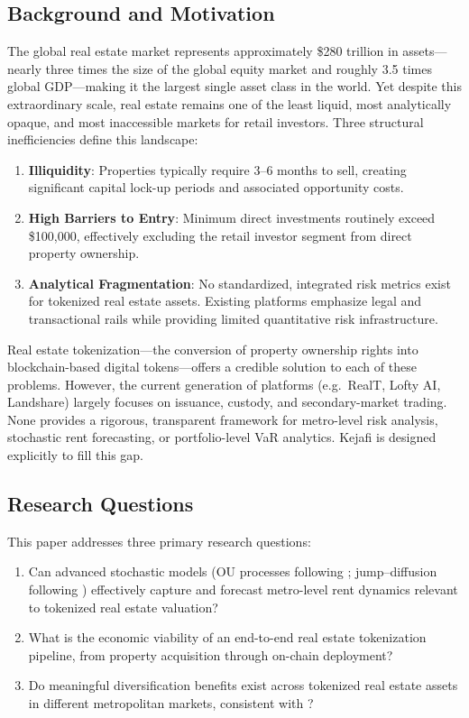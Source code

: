 \documentclass[11pt,letterpaper]{article}
\begin{document}
\subsection{Background and Motivation}

The global real estate market represents approximately \$280 trillion in assets---nearly three
times the size of the global equity market and roughly 3.5 times global GDP---making it the
largest single asset class in the world. Yet despite this extraordinary scale, real estate
remains one of the least liquid, most analytically opaque, and most inaccessible markets for
retail investors. Three structural inefficiencies define this landscape:

\begin{enumerate}[leftmargin=2em]
  \item \textbf{Illiquidity}: Properties typically require 3--6 months to sell, creating
  significant capital lock-up periods and associated opportunity costs.
  \item \textbf{High Barriers to Entry}: Minimum direct investments routinely exceed
  \$100{,}000, effectively excluding the retail investor segment from direct property ownership.
  \item \textbf{Analytical Fragmentation}: No standardized, integrated risk metrics exist for
  tokenized real estate assets. Existing platforms emphasize legal and transactional rails
  while providing limited quantitative risk infrastructure.
\end{enumerate}

Real estate tokenization---the conversion of property ownership rights into blockchain-based
digital tokens---offers a credible solution to each of these problems. However, the current
generation of platforms (e.g.\ RealT, Lofty AI, Landshare) largely focuses on issuance,
custody, and secondary-market trading. None provides a rigorous, transparent framework for
metro-level risk analysis, stochastic rent forecasting, or portfolio-level VaR analytics.
Kejafi is designed explicitly to fill this gap.

\subsection{Research Questions}

This paper addresses three primary research questions:

\begin{enumerate}[leftmargin=2em]
  \item Can advanced stochastic models (OU processes following \citealt{vasicek1977};
  jump--diffusion following \citealt{merton1976}) effectively capture and forecast metro-level
  rent dynamics relevant to tokenized real estate valuation?
  \item What is the economic viability of an end-to-end real estate tokenization pipeline,
  from property acquisition through on-chain deployment?
  \item Do meaningful diversification benefits exist across tokenized real estate assets in
  different metropolitan markets, consistent with \citet{glaeser2018}?
\end{enumerate}
\end{document}
